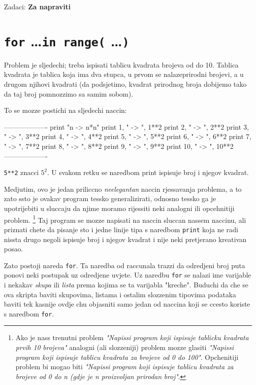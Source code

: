 Zadaci: \textbf{Za napraviti}

\section{\verb"for" \dots \verb"in range(" \dots \verb")"}

Problem je sljedechi; treba ispisati tablicu kvadrata brojeva od do 10.
Tablica kvadrata je tablica koja ima dva stupca, u prvom se nalazeprirodni
brojevi, a u drugom njihovi kvadrati (da podsjetimo, kvadrat prirodnog
broja dobijemo tako da taj broj pomnozzimo sa samim sobom).

To se mozze postichi na sljedechi naccin:

-------------------
print "n -> n*n"
print 1, " -> ", 1**2
print 2, " -> ", 2**2
print 3, " -> ", 3**2
print 4, " -> ", 4**2
print 5, " -> ", 5**2
print 6, " -> ", 6**2
print 7, " -> ", 7**2
print 8, " -> ", 8**2
print 9, " -> ", 9**2
print 10, " -> ", 10**2
-------------------

\verb"5**2" znacci $5^2$. U svakom retku se naredbom print ispisuje broj i
njegov kvadrat. 

Medjutim, ovo je jedan priliccno \emph{neelegantan} naccin rjessavanja
problema, a to zato ssto je ovakav program tessko generalizirati,
odnosno tessko ga je upotrijebiti u sluccaju da njime moramo
rijessiti neki analogni ili opcehnitiji problem. 
\footnote{
	Ako je nass trenutni
	problem \emph{"Napissi program koji ispisuje tablicku kvadrata
	prvih 10 brojeva"} analogni (ali slozzeniji) problem mozze glasiti
	\emph{"Napissi program koji ispisuje tablicu kvadrata za brojeve
	od 0 do 100"}. Opchenitiji problem bi mogao biti \emph{"Napissi
	program koji ispisuje tablicu kvadrata za brojeve od 0 do n (gdje
	je n proizvoljan prirodan broj"}. 
}
Taj program se mozze napisati
na naccin sluccan nassem naccinu, ali priznati chete da pisanje
sto i jedne linije tipa s naredbom \verb"print" koja ne radi nissta
drugo negoli ispisuje broj i njegov kvadrat i nije neki pretjerano
kreativan posao.

Zato postoji nareda \verb"for". Ta naredba od raccunala trazzi da
odredjeni broj puta ponovi neki postupak uz odredjene uvjete. Uz
naredbu \verb"for" se nalazi ime varijable i nekakav \emph{skupa}
ili \emph{lista} prema kojima se ta varijabla "kreche". Buduchi da
che se ova skripta baviti skupovima, listama i ostalim slozzenim
tipovima podataka baviti tek kasnije ovdje chu objasniti samo jedan
od naccina koji se ccesto koriste s naredbom \verb"for".

